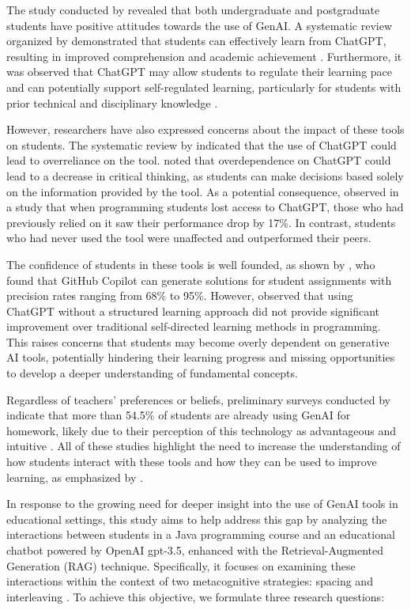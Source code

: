\documentclass[a4paper,twoside]{article}
\begin{document}
The study conducted by \cite{chan23} revealed that both undergraduate and
postgraduate students have positive attitudes towards the use of GenAI.
A systematic review organized by \cite{Lo24} demonstrated that students can
effectively learn from ChatGPT, resulting in improved comprehension and academic
achievement \citep{Callejo24}. Furthermore, it was observed that ChatGPT may
allow students to regulate their learning pace \citep{Baha24} and can
potentially support self-regulated learning, particularly for students with
prior technical and disciplinary knowledge \citep{Xia23}.

However, researchers have also expressed concerns about the impact of these
tools on students. The systematic review by \cite{Murillo23} indicated that the
use of ChatGPT could lead to overreliance on the tool. \cite{chan23} noted that
overdependence on ChatGPT could lead to a decrease in critical thinking, as
students can make decisions based solely on the information provided by the
tool. As a potential consequence, \cite{Bastani24} observed in a study that when
programming students lost access to ChatGPT, those who had previously relied
on it saw their performance drop by 17\%. In contrast, students who had never
used the tool were unaffected and outperformed their peers.

The confidence of students in these tools is well founded, as shown by
\cite{Puryear22}, who found that GitHub Copilot can generate solutions for
student assignments with precision rates ranging from 68\% to 95\%. However,
\cite{Boudouaia24} observed that using ChatGPT without a structured learning
approach did not provide significant improvement over traditional self-directed
learning methods in programming. This raises concerns that students may become
overly dependent on generative AI tools, potentially hindering their learning
progress and missing opportunities to develop a deeper understanding of
fundamental concepts.

Regardless of teachers' preferences or beliefs, preliminary surveys conducted
by \cite{Dickey24} indicate that more than 54.5\% of students are already using
GenAI for homework, likely due to their perception of this technology as
advantageous and intuitive \citep{Boudouaia24}. All of these studies highlight
the need to increase the understanding of how students interact with these tools
and how they can be used to improve learning, as emphasized by \cite{Lo24}.

In response to the growing need for deeper insight into the use of GenAI tools
in educational settings, this study aims to help address this gap by analyzing
the interactions between students in a Java programming course and an
educational chatbot powered by OpenAI gpt-3.5, enhanced with the
Retrieval-Augmented Generation (RAG) technique. Specifically, it focuses on
examining these interactions within the context of two metacognitive strategies:
spacing \citep{Carvalho20} and interleaving \citep{Rivers21}. To achieve this
objective, we formulate three research questions:
\end{document}
